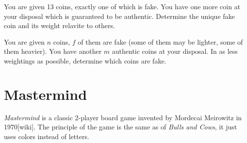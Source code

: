 \begin{problem}
You are given 13 coins, exactly one of which is fake.
You have one more coin at your disposal which is guaranteed to be authentic.
Determine the unique fake coin and its weight relavite to others.
\end{problem}

\begin{problem}
You are given $n$ coins, $f$ of them are fake (some of them may be lighter, some of them heavier).
You have another $m$ authentic coins at your disposal.
In as less weightings as possible, determine which coins are fake.
\end{problem}

\section{Mastermind}

\emph{Mastermind} is a classic 2-player board game invented by Mordecai Meirowitz in 1970[wiki].
The principle of the game is the same as of \emph{Bulls and Cows}, it just uses colors instead of letters.



